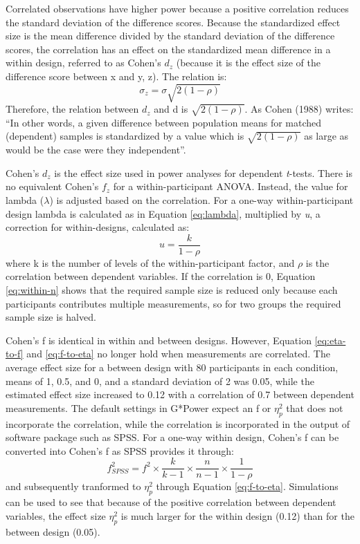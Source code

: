 \documentclass[,jou, draftfirst, a4paper,floatsintext]{apa6}
\begin{document}
Correlated observations have higher power because a positive correlation reduces the standard deviation of the difference scores.
Because the standardized effect size is the mean difference divided by the standard deviation of the difference scores, the correlation has an effect on the standardized mean difference in a within design, referred to as Cohen's \(d_z\) (because it is the effect size of the difference score between x and y, z). The relation is:
\begin{equation}
\sigma_{z}=\sigma\sqrt{2(1-\rho)}
\end{equation}
Therefore, the relation between \(d_z\) and d is \(\sqrt{2(1-\rho)}\).
As Cohen (1988) writes: \enquote{In other words, a given difference between population means for matched (dependent) samples is standardized by a value which is \(\sqrt{2(1-\rho)}\) as large as would be the case were they independent}.

Cohen's \(d_z\) is the effect size used in power analyses for dependent \emph{t}-tests.
There is no equivalent Cohen's \(f_z\) for a within-participant ANOVA.
Instead, the value for lambda (\(\lambda\)) is adjusted based on the correlation.
For a one-way within-participant design lambda is calculated as in Equation \eqref{eq:lambda}, multiplied by \emph{u}, a correction for within-designs, calculated as:
\begin{equation}
u = \frac{k}{1-\rho}
\end{equation}
where k is the number of levels of the within-participant factor, and \(\rho\) is the correlation between dependent variables.
If the correlation is 0, Equation \eqref{eq:within-n} shows that the required sample size is reduced only because each participants contributes multiple measurements, so for two groups the required sample size is halved.

Cohen's f is identical in within and between designs.
However, Equation \eqref{eq:eta-to-f} and \eqref{eq:f-to-eta} no longer hold when measurements are correlated.
The average effect size for a between design with 80 participants in each condition, means of 1, 0.5, and 0, and a standard deviation of 2 was 0.05, while the estimated effect size increased to 0.12 with a correlation of 0.7 between dependent measurements.
The default settings in G*Power expect an f or \(\eta_p^2\) that does not incorporate the correlation, while the correlation is incorporated in the output of software package such as SPSS.
For a one-way within design, Cohen's f can be converted into Cohen's f as SPSS provides it through:
\begin{equation}
f^2_{SPSS} = f^2 \times \frac{k}{k-1} \times \frac{n}{n-1} \times \frac{1}{1-\rho}
\end{equation}
and subsequently tranformed to \(\eta_p^2\) through Equation \eqref{eq:f-to-eta}.
Simulations can be used to see that because of the positive correlation between dependent variables, the effect size \(\eta_p^2\) is much larger for the within design (0.12) than for the between design (0.05).
\end{document}
